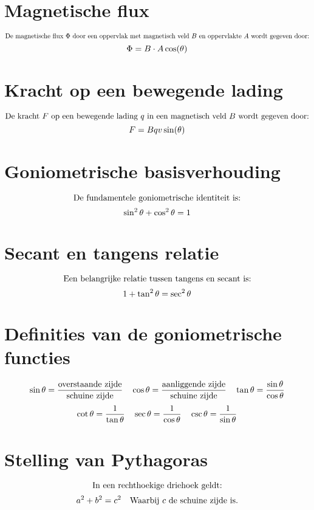 \documentclass{article}
\begin{document}
\section*{Magnetische flux}
\[ \text{De magnetische flux } \Phi \text{ door een oppervlak met magnetisch veld } B \text{ en oppervlakte } A \text{ wordt gegeven door:} \\
\]
\[ \Phi = B \cdot A \cos(\theta) \\
\]

\section*{Kracht op een bewegende lading}
\[ \text{De kracht } F \text{ op een bewegende lading } q \text{ in een magnetisch veld } B \text{ wordt gegeven door:} \\
\]
\[ F = Bqv \sin(\theta) \\
\]

\section*{Goniometrische basisverhouding}
\[ \text{De fundamentele goniometrische identiteit is:} \\
\]
\[ \sin^2 \theta + \cos^2 \theta = 1 \\
\]

\section*{Secant en tangens relatie}
\[ \text{Een belangrijke relatie tussen tangens en secant is:} \\
\]
\[ 1 + \tan^2 \theta = \sec^2 \theta \\
\]

\section*{Definities van de goniometrische functies}
\[ \sin \theta = \frac{\text{overstaande zijde}}{\text{schuine zijde}} \quad \cos \theta = \frac{\text{aanliggende zijde}}{\text{schuine zijde}} \quad \tan \theta = \frac{\sin \theta}{\cos \theta} \\
\]
\[ \cot \theta = \frac{1}{\tan \theta} \quad \sec \theta = \frac{1}{\cos \theta} \quad \csc \theta = \frac{1}{\sin \theta} \\
\]

\section*{Stelling van Pythagoras}
\[ \text{In een rechthoekige driehoek geldt:} \\
\]
\[ a^2 + b^2 = c^2 \quad \text{Waarbij } c \text{ de schuine zijde is.} \\
\]
\end{document}
